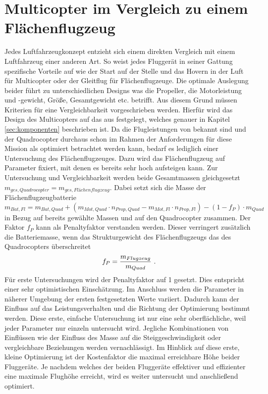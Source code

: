 \section{Multicopter im Vergleich zu einem Flächenflugzeug}
\label{sec:multicopter_vs_flaechenflugzeug}
Jedes Luftfahrzeugkonzept entzieht sich einem direkten Vergleich mit einem Luftfahrzeug einer anderen Art. So weist jedes Fluggerät in seiner Gattung spezifische Vorteile auf wie der Start auf der Stelle und das Hovern in der Luft für Multicopter oder der Gleitflug für Flächenflugzeuge. Die optimale Auslegung beider führt zu unterschiedlichen Designs was die Propeller, die Motorleistung und -gewicht, Größe, Gesamtgewicht etc. betrifft. Aus diesem Grund müssen Kriterien für eine Vergleichbarkeit vorgeschrieben werden. Hierfür wird das Design des Multicopters auf das aus \cite{Anderson.2018} festgelegt, welches genauer in Kapitel \ref{sec:komponenten} beschrieben ist. Da die Flugleistungen von \cite{Anderson.2018} bekannt sind und der Quadrocopter durchaus schon im Rahmen der Anforderungen für diese Mission als optimiert betrachtet werden kann, bedarf es lediglich einer Untersuchung des Flächenflugzeuges. Dazu wird das Flächenflugzeug auf Parameter fixiert, mit denen es bereits sehr hoch aufsteigen kann. Zur Untersuchung und Vergleichbarkeit werden beide Gesamtmassen gleichgesetzt \ensuremath{m_{ges,Quadrocopter} = m_{ges,Flächenflugzeug}}. Dabei setzt sich die Masse der Flächenflugzeugbatterie   
\begin{equation}
	m_{Bat,Fl} = m_{Bat,Quad} + (m_{Mot,Quad}\cdot n_{Prop,Quad} - m_{Mot,Fl}\cdot n_{Prop,Fl}) - (1-f_P)\cdot m_{Quad}  
\end{equation}
in Bezug auf bereits gewählte Massen und auf den Quadrocopter zusammen. Der Faktor \ensuremath{f_P} kann als Penaltyfaktor verstanden werden. Dieser verringert zusätzlich die Batteriemasse, wenn das Strukturgewicht des Flächenflugzeugs das des Quadrocopters überschreitet
\begin{equation}
	f_P = \frac{m_{Flugzeug}}{m_{Quad}} ~\text{.}
	\label{eq:penalty}
\end{equation} 
Für erste Untersuchungen wird der Penaltyfaktor auf 1 gesetzt. Dies entspricht einer sehr optimistischen Einschätzung. Im Anschluss werden die Parameter in näherer Umgebung der ersten festgesetzten Werte variiert. Dadurch kann der Einfluss auf das Leistungsverhalten und die Richtung der Optimierung bestimmt werden. Diese erste, einfache Untersuchung ist nur eine sehr oberflächliche, weil jeder Parameter nur einzeln untersucht wird. Jegliche Kombinationen von Einflüssen wie der Einfluss des Masse auf die Steiggeschwindigkeit oder vergleichbare Beziehungen werden vernachlässigt. Im Hinblick auf diese erste, kleine Optimierung ist der Kostenfaktor die maximal erreichbare Höhe beider Fluggeräte. Je nachdem welches der beiden Fluggeräte effektiver und effizienter eine maximale Flughöhe erreicht, wird es weiter untersucht und anschließend optimiert. 


